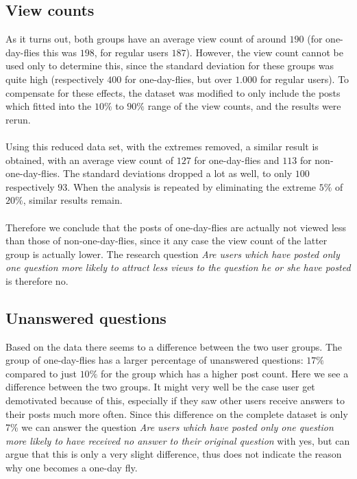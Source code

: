 \documentclass[conference]{IEEEtran}
\begin{document}
\subsection{View counts}
As it turns out, both groups have an average view count of around $190$ (for one-day-flies this was $198$, for regular users $187$). However, the view count cannot be used only to determine this, since the standard deviation for these groups was quite high (respectively $400$ for one-day-flies, but over $1.000$ for regular users). To compensate for these effects, the dataset was modified to only include the posts which fitted into the $10\%$ to $90\%$ range of the view counts, and the results were rerun.
\\
\\
Using this reduced data set, with the extremes removed, a similar result is obtained, with an average view count of $127$ for one-day-flies and $113$ for non-one-day-flies. The standard deviations dropped a lot as well, to only $100$ respectively $93$. When the analysis is repeated by eliminating the extreme $5\%$ of $20\%$, similar results remain.
\\
\\
Therefore we conclude that the posts of one-day-flies are actually not viewed less than those of non-one-day-flies, since it any case the view count of the latter group is actually lower. The research question \textit{Are users which have posted only one question more likely to attract less views to the question he or she have posted} is therefore no.

\subsection{Unanswered questions}

Based on the data there seems to a difference between the two user groups. The group of one-day-flies has a larger percentage of unanswered questions: $17\%$ compared to just $10\%$ for the group which has a higher post count. Here we see a  difference between the two groups. It might very well be the case user get demotivated because of this, especially if they saw other users receive answers to their posts much more often. Since this difference on the complete dataset is only 7\% we can answer the question \textit{Are users which have posted only one question more likely to have received no answer to their original question} with yes, but can argue that this is only a very slight difference, thus does not indicate the reason why one becomes a one-day fly.
\end{document}
